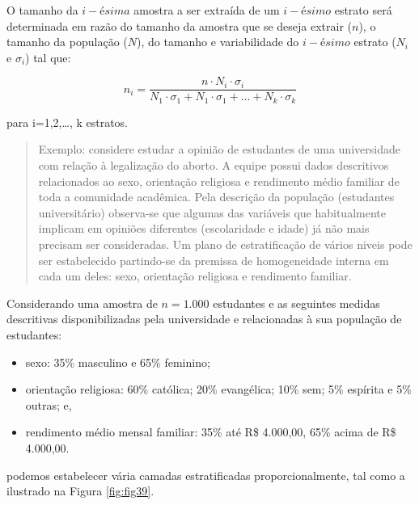 \documentclass[
]{book}
\providecommand{\tightlist}{%
  \setlength{\itemsep}{0pt}\setlength{\parskip}{0pt}}
\begin{document}
\hfill\break

O tamanho da \(i-ésima\) amostra a ser extraída de um \(i-ésimo\) estrato será determinada em razão do tamanho da amostra que se deseja extrair (\(n\)), o tamanho da população (\(N\)), do tamanho e variabilidade do \(i-ésimo\) estrato (\(N_{i}\) e \(\sigma_{i}\)) tal que:

\hfill\break

\[
n_{i} =\frac{ n \cdot N_{i} \cdot \sigma_{i} }{ N_{1} \cdot \sigma_{1} + N_{1} \cdot \sigma_{1} + \dots+ N_{k} \cdot \sigma_{k}}
\]

para i=1,2,\ldots, k estratos.

\hfill\break

\begin{quote}
Exemplo: considere estudar a opinião de estudantes de uma universidade com relação à legalização do aborto. A equipe possui dados descritivos relacionados ao sexo, orientação religiosa e rendimento médio familiar de toda a comunidade acadêmica.
Pela descrição da população (estudantes universitário) observa-se que algumas das variáveis que habitualmente implicam em opiniões diferentes (escolaridade e idade) já não mais precisam ser consideradas.
Um plano de estratificação de vários niveis pode ser estabelecido partindo-se da premissa de homogeneidade interna em cada um deles: sexo, orientação religiosa e rendimento familiar.
\end{quote}

\hfill\break

Considerando uma amostra de \(n=1.000\) estudantes e as seguintes medidas descritivas disponibilizadas pela universidade e relacionadas à sua população de estudantes:

\hfill\break

\begin{itemize}
\tightlist
\item
  sexo: 35\% masculino e 65\% feminino;\\
\item
  orientação religiosa: 60\% católica; 20\% evangélica; 10\% sem; 5\% espírita e 5\% outras; e,\\
\item
  rendimento médio mensal familiar: 35\% até R\$ 4.000,00, 65\% acima de R\$ 4.000,00.
\end{itemize}

\hfill\break

podemos estabelecer vária camadas estratificadas proporcionalmente, tal como a ilustrado na Figura \ref{fig:fig39}.
\end{document}
